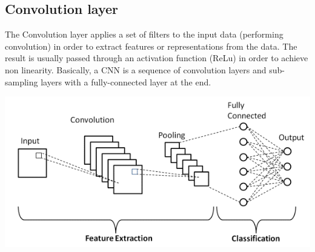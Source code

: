 \subsection{Convolution layer}
The Convolution layer applies a set of filters to the input data (performing convolution) in order to extract features or representations from the data. The result is usually passed through an activation function (ReLu) in order to achieve non linearity. \newline\newline
Basically, a CNN is a sequence of convolution layers and sub-sampling layers with a fully-connected layer at the end.
\begin{center}
    \includegraphics[scale = 0.7]{images/CNN.png}
\end{center}

